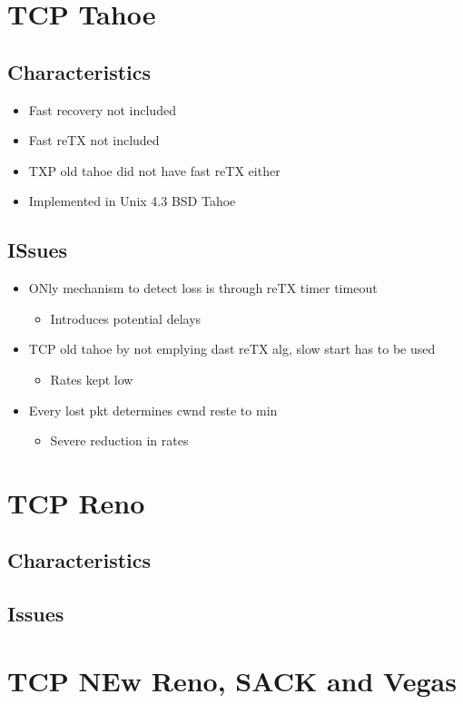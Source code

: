 \documentclass[a4paper]{article}
\begin{document}
\section{TCP Tahoe}
\subsection{Characteristics}
\begin{itemize}
	\item Fast recovery not included
	\item Fast reTX not included
	\item TXP old tahoe did not have fast reTX either
	\item Implemented in Unix 4.3 BSD Tahoe
\end{itemize}
\subsection{ISsues}
\begin{itemize}
	\item ONly mechanism to detect loss is through reTX timer timeout
	\begin{itemize}
		\item Introduces potential delays
	\end{itemize}
	\item TCP old tahoe by not emplying dast reTX alg, slow start has to be
		used
	\begin{itemize}
		\item Rates kept low
	\end{itemize}
	\item Every lost pkt determines cwnd reste to min
	\begin{itemize}
		\item Severe reduction in rates
	\end{itemize}
\end{itemize}
\section{TCP Reno}
\subsection{Characteristics}
\subsection{Issues}
\section{TCP NEw Reno, SACK and Vegas}
\end{document}
